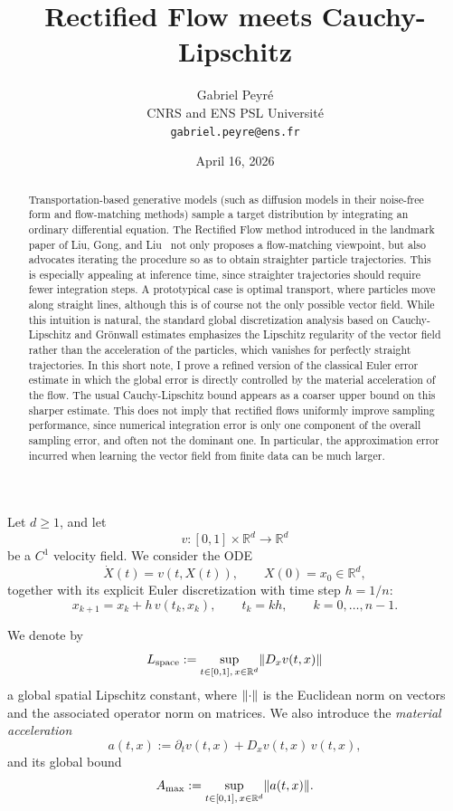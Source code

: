\documentclass[11pt]{article}
\title{Rectified Flow meets Cauchy-Lipschitz}
\author{Gabriel Peyr\'e\\
CNRS and ENS PSL Universit\'e\\
\texttt{gabriel.peyre@ens.fr}}
\date{April 16, 2026}
\DeclarePairedDelimiter{\norm}{\lVert}{\rVert}
\begin{document}
\maketitle

\begin{abstract}
Transportation-based generative models (such as diffusion models in their noise-free form and flow-matching methods) sample a target distribution by integrating an ordinary differential equation. The Rectified Flow method introduced in the landmark paper of Liu, Gong, and Liu~\cite{liu2022rectified} not only proposes a flow-matching viewpoint, but also advocates iterating the procedure so as to obtain straighter particle trajectories. This is especially appealing at inference time, since straighter trajectories should require fewer integration steps. A prototypical case is optimal transport, where particles move along straight lines, although this is of course not the only possible vector field. While this intuition is natural, the standard global discretization analysis based on Cauchy-Lipschitz and Gr\"onwall estimates emphasizes the Lipschitz regularity of the vector field rather than the acceleration of the particles, which vanishes for perfectly straight trajectories.
%
In this short note, I prove a refined version of the classical Euler error estimate in which the global error is directly controlled by the material acceleration of the flow. The usual Cauchy-Lipschitz bound appears as a coarser upper bound on this sharper estimate. This does not imply that rectified flows uniformly improve sampling performance, since numerical integration error is only one component of the overall sampling error, and often not the dominant one. In particular, the approximation error incurred when learning the vector field from finite data can be much larger.
\end{abstract}


Let $d\geq 1$, and let
\[
v : [0,1]\times \mathbb{R}^d \to \mathbb{R}^d
\]
be a $C^1$ velocity field. We consider the ODE
\[
\dot X(t)=v(t,X(t)),
\qquad
X(0)=x_0\in\mathbb{R}^d,
\]
together with its explicit Euler discretization with time step $h=1/n$:
\[
x_{k+1}=x_k+h\,v(t_k,x_k),
\qquad
t_k=kh,
\qquad
k=0,\dots,n-1.
\]

We denote by
\[
L_{\mathrm{space}}
:=
\sup_{t\in[0,1],\,x\in\mathbb{R}^d}
\norm{D_x v(t,x)}
\]
a global spatial Lipschitz constant, where $\norm{\cdot}$ is the Euclidean norm on vectors and the associated operator norm on matrices. We also introduce the \emph{material acceleration}
\[
a(t,x)
:=
\partial_t v(t,x)+D_x v(t,x)\,v(t,x),
\]
and its global bound
\[
A_{\max}
:=
\sup_{t\in[0,1],\,x\in\mathbb{R}^d}\norm{a(t,x)}.
\]
\end{document}
